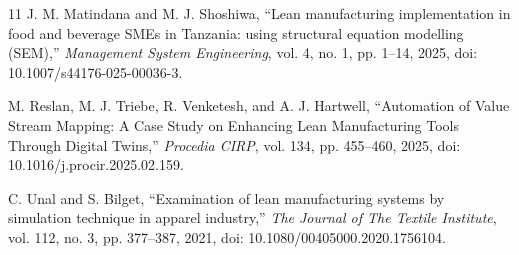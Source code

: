 \documentclass[12pt,a4paper]{article}
\begin{document}
\begin{thebibliography}{11}
J. M. Matindana and M. J. Shoshiwa, ``Lean manufacturing implementation in food and beverage SMEs in Tanzania: using structural equation modelling (SEM),'' \emph{Management System Engineering}, vol. 4, no. 1, pp. 1--14, 2025, doi: 10.1007/s44176-025-00036-3.

M. Reslan, M. J. Triebe, R. Venketesh, and A. J. Hartwell, ``Automation of Value Stream Mapping: A Case Study on Enhancing Lean Manufacturing Tools Through Digital Twins,'' \emph{Procedia CIRP}, vol. 134, pp. 455--460, 2025, doi: 10.1016/j.procir.2025.02.159.

C. Unal and S. Bilget, ``Examination of lean manufacturing systems by simulation technique in apparel industry,'' \emph{The Journal of The Textile Institute}, vol. 112, no. 3, pp. 377--387, 2021, doi: 10.1080/00405000.2020.1756104.

\end{thebibliography}
\end{document}
